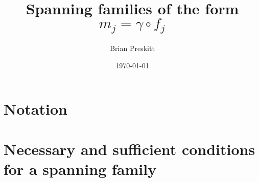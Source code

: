

\title{Spanning families of the form $m_j = \gamma \circ f_j$}
\author{Brian Preskitt}
\date{\today}

\maketitle
\section{Notation}

\section{Necessary and sufficient conditions for a spanning family}


